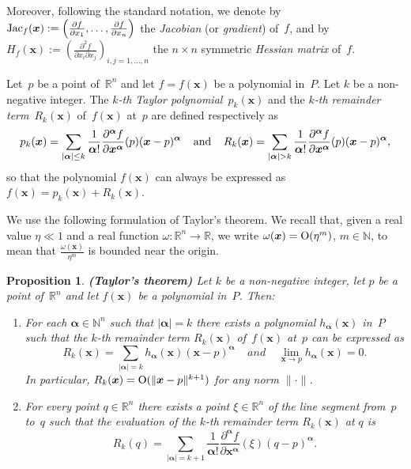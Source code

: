 \documentclass[10pt]{article}
\newcommand{\x}{{\bm x}}
\newcommand{\alfa}{{\bm \alpha}}
\newcommand\N{{\mathbb N}}
\newcommand\R{{\mathbb R}}
\def\Jac{\mathop{\rm Jac}\nolimits}
\newtheorem{prop}[theorem]{Proposition}
\newtheorem{definition}[theorem]{Definition}
\newenvironment{definition*}{\begin{definition}\em}{\end{definition}}
\begin{document}
Moreover, following the standard notation,
we denote by $\Jac_f(\x):=\left( \frac{\partial f}{\partial x_1}, \ldots, \frac{\partial f}{\partial x_n}\right)$
 the {\em Jacobian} (or {\em gradient}) of~$f$,  and by $H_f(\x):= \left(\frac{\partial^2f}{\partial x_i\partial x_j}\right)_{i,j=1,\ldots,n}$ the $n\times n$ symmetric   {\em Hessian matrix} of~$f$.

\begin{definition*}\label{defTaylor}
Let~$p$ be a point of~$\R^n$ and 
let $f=f(\x)$ be a polynomial in~$P$. 
 Let $k$ be a non-negative integer.
The {\em $k$-th Taylor polynomial~$p_k(\x)$} and the {\em $k$-th remainder 
term}~$R_k(\x)$ of~$f(\x)$ at~$p$ are defined respectively as
$$p_k(\x) = \sum_{|\alfa| \le k} \frac{1}{\alfa!} 
\frac{\partial^\alfa f}{\partial \x^\alfa}(p) (\x-p)^\alfa \;\;\;\;{\rm and} \;\;\;\;
R_k(\x) = \sum_{|\alfa| > k} \frac{1}{\alfa!} 
\frac{\partial^\alfa f}{\partial \x^\alfa}(p) (\x-p)^\alfa,$$ so  that 
 the polynomial  $f(\x)$ can always be expressed  as $f(\x)=p_k(\x) + R_k(\x)$.
\end{definition*}


We use the following formulation of Taylor's theorem. We recall  that, given a real value $\eta\ll 1$ and  a real function $\omega:\R^n\to \R$,  we write $\omega(\x)={\rm O}(\eta^m)$, $m\in \N$, to mean that $\frac{\omega(\x)}{\eta^m}$ is bounded near the origin.

\begin{prop}{\bf (Taylor's theorem)} \label{propTaylor}
Let $k$ be a non-negative integer, let $p$ be a point of~$\R^n$ 
and let $f(\x)$ be a polynomial in~$P$. Then:
\begin{enumerate}
\em\item\em
 For each $\alfa \in \N^n$ such that $|\alfa|=k$ there exists a polynomial
$h_\alfa(\x)$  in~$P$ such that the $k$-th remainder term $R_k(\x)$ of~$f(\x)$ at~$p$ 
can be expressed as 
$$
R_k(\x) = \sum_{|\alfa|=k} h_\alfa(\x) (\x-p)^\alfa\;\;\;\;
 and\;\;\;\; \lim_{\x \rightarrow p} h_\alfa(\x) =0.$$
 In particular, $R_k(\x)={\rm O}(\|\x-p\|^{k+1})$ for any norm $\| \cdot \|$.
\em\item\em For every point $q \in \R^n$ there exists 
a point $\xi \in \R^n$ of the line segment from~$p$ to~$q$ such that the evaluation of
the $k$-th remainder term $R_k(\x)$ at $q$  is
$$
R_k(q) = \sum_{|\alfa|=k+1} \frac{1}{\alfa!}  \frac{\partial^\alfa f}{\partial \x^\alfa}(\xi)(q-p)^\alfa.
$$
\end{enumerate}
\end{prop}
\end{document}
